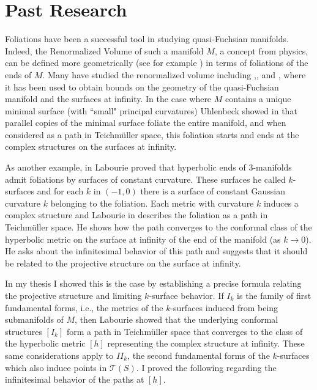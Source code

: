 \documentclass[11pt]{amsart}
\begin{document}
\section{Past Research}
Foliations have been a successful tool in studying quasi-Fuchsian manifolds.
Indeed, the Renormalized Volume of such a manifold $M$, a concept from physics, can be defined more geometrically (see for example \cite{krasnov-schlenker2008}) in terms of foliations of the ends of $M$. 
Many have studied the renormalized volume including \cite{schlenker2013},\cite{ciobotaru-moroianu2016}, and \cite{bridgeman-brock-bromberg2019}, where it has been used to obtain bounds on the geometry of the quasi-Fuchsian manifold and the surfaces at infinity. 
In the case where $M$ contains a unique minimal surface (with ``small" principal curvatures)  Uhlenbeck showed in \cite{uhlenbeck1983} that parallel copies of the minimal surface foliate the entire manifold, and when considered as a path in Teichm\"uller space, this foliation starts and ends at the complex structures on the surfaces at infinity.

As another example, in \cite{labourie1991} Labourie proved that hyperbolic ends of 3-manifolds admit foliations by surfaces of constant curvature. 
These surfaces he called $k$-surfaces and for each $k$ in $(-1,0)$ there is a surface of constant Gaussian curvature $k$ belonging to the foliation. 
Each metric with curvature $k$ induces a complex structure and Labourie in \cite{labourie1992} describes the foliation as a path in Teichm\"uller space. 
He shows how the path converges to the conformal class of the hyperbolic metric on the surface at infinity of the end of the manifold (as $k \to 0$).
He asks about the infinitesimal behavior of this path and suggests that it should be related to the projective structure on the surface at infinity. 

In my thesis \cite{quinn2020} I showed this is the case by establishing a precise formula relating the projective structure and limiting $k$-surface behavior.
If $I_k$ is the family of first fundamental forms, i.e., the metrics of the $k$-surfaces induced from being submanifolds of $M$, then Labourie showed that the underlying conformal structures $[I_k]$ form a path in Teichm\"uller space that converges to the class of the hyperbolic metric $[h]$ representing the complex structure at infinity. 
These same considerations apply to $I\!I_k$, the second fundamental forms of the $k$-surfaces which also induce points in $\mathcal{T}(S)$. 
I proved the following regarding the infinitesimal behavior of the paths at $[h]$.
\end{document}
